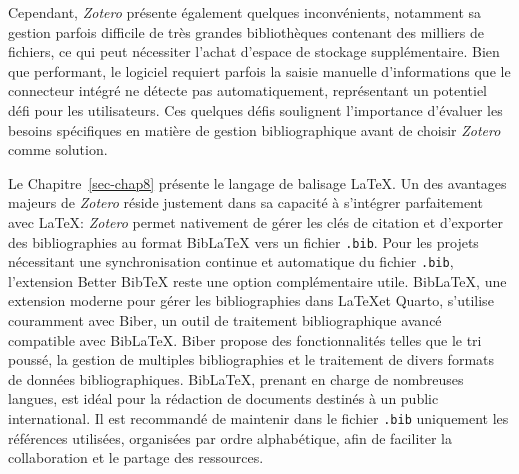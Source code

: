 \documentclass[
  letterpaper,
  DIV=11,
  numbers=noendperiod,
  oneside]{scrreprt}
\begin{document}
Cependant, \emph{Zotero} présente également quelques inconvénients,
notamment sa gestion parfois difficile de très grandes bibliothèques
contenant des milliers de fichiers, ce qui peut nécessiter l'achat
d'espace de stockage supplémentaire. Bien que performant, le logiciel
requiert parfois la saisie manuelle d'informations que le connecteur
intégré ne détecte pas automatiquement, représentant un potentiel défi
pour les utilisateurs. Ces quelques défis soulignent l'importance
d'évaluer les besoins spécifiques en matière de gestion bibliographique
avant de choisir \emph{Zotero} comme solution.

Le Chapitre~\ref{sec-chap8} présente le langage de balisage \LaTeX. Un
des avantages majeurs de \emph{Zotero} réside justement dans sa capacité
à s'intégrer parfaitement avec \LaTeX : \emph{Zotero} permet nativement
de gérer les clés de citation et d'exporter des bibliographies au format
BibLaTeX vers un fichier \texttt{.bib}. Pour les projets nécessitant une
synchronisation continue et automatique du fichier \texttt{.bib},
l'extension Better BibTeX reste une option complémentaire utile.
BibLaTeX, une extension moderne pour gérer les bibliographies dans
\LaTeX et Quarto, s'utilise couramment avec Biber, un outil de
traitement bibliographique avancé compatible avec BibLaTeX. Biber
propose des fonctionnalités telles que le tri poussé, la gestion de
multiples bibliographies et le traitement de divers formats de données
bibliographiques. BibLaTeX, prenant en charge de nombreuses langues, est
idéal pour la rédaction de documents destinés à un public international.
Il est recommandé de maintenir dans le fichier \texttt{.bib} uniquement
les références utilisées, organisées par ordre alphabétique, afin de
faciliter la collaboration et le partage des ressources.

\newlength\holdLTleft\newlength\holdLTright\setlength\holdLTleft{\LTleft}\relax\setlength\holdLTright{\LTright}\relax\setlength{}

\setlength{}
\end{document}

